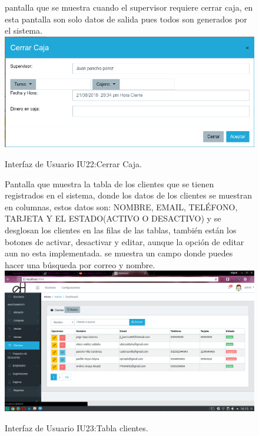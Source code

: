 \begin{figure}[htbp!]
	\begin{center}
	pantalla que se muestra cuando el supervisor requiere cerrar caja, en esta pantalla son solo datos de salida pues todos son generados por el sistema.
\includegraphics[width=\textwidth]{Pantallas/CerrarCaja}
		\caption{Interfaz de Usuario IU22:Cerrar Caja.}
	\end{center}
\end{figure}

\begin{figure}[htbp!]
	\begin{center}
	Pantalla que muestra la tabla de los clientes que se tienen registrados en el sistema, donde los datos de los clientes se muestran en columnas, estos datos son: NOMBRE, EMAIL, TELÉFONO, TARJETA Y EL ESTADO(ACTIVO O DESACTIVO) y se desglosan los clientes en las filas de las tablas, también están los botones de activar, desactivar y editar, aunque la opción de editar aun no esta implementada.
	se muestra un campo donde puedes hacer una búsqueda por correo y nombre.
\includegraphics[width=\textwidth]{Pantallas/tablaClientes}
		\caption{Interfaz de Usuario IU23:Tabla clientes.}
	\end{center}
\end{figure}
